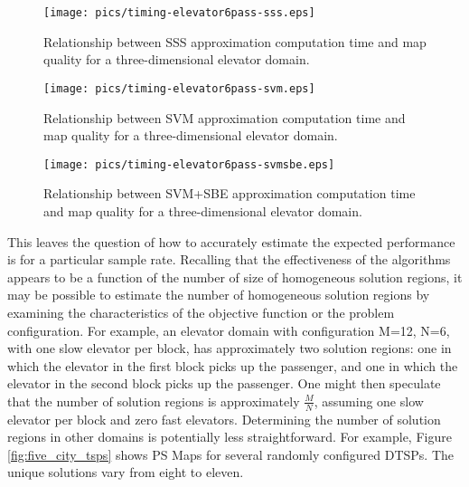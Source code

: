 \begin{figure}
\begin{center}
\texttt{[image: pics/timing-elevator6pass-sss.eps]}
\caption{Relationship between SSS approximation computation time and map quality for a three-dimensional elevator domain.}
\label{fig:timing-elevator6pass-sss}
\end{center}
\end{figure}

\begin{figure}
\begin{center}
\texttt{[image: pics/timing-elevator6pass-svm.eps]}
\caption{Relationship between SVM approximation computation time and map quality for a three-dimensional elevator domain.}
\label{fig:timing-elevator6pass-svm}
\end{center}
\end{figure}

\begin{figure}
\begin{center}
\texttt{[image: pics/timing-elevator6pass-svmsbe.eps]}
\caption{Relationship between SVM+SBE approximation computation time and map quality for a three-dimensional elevator domain.}
\label{fig:timing-elevator6pass-svmsbe}
\end{center}
\end{figure}


This leaves the question of how to accurately estimate the expected performance is for a particular sample rate. Recalling that the effectiveness of the algorithms appears to be a function of the number of size of homogeneous solution regions, it may be possible to estimate the number of homogeneous solution regions by examining the  characteristics of the objective function or the problem configuration.  For example, an elevator domain with configuration M=12, N=6, with one slow elevator per block, has approximately two solution regions:  one in which the elevator in the first block picks up the passenger, and one in which the elevator in the second block picks up the passenger.  One might then speculate that the  number of solution regions is approximately $\frac{M}{N}$, assuming one slow elevator per block and zero fast elevators.  Determining the number of solution regions in other domains is potentially less straightforward.  For example, Figure \ref{fig:five_city_tsps} shows PS Maps for several randomly configured DTSPs.  The unique solutions vary from eight to eleven.


